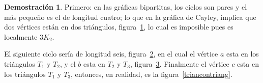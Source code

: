 \documentclass[11pt]{book}
\theoremstyle{definition}
\newtheorem{demostration}{Demostración}
\begin{document}
\begin{demostration}Primero: en las gráficas bipartitas, los ciclos
  son pares y el más pequeño es el de longitud cuatro; lo que en la
  gráfica de Cayley, implica que dos vértices están en dos triángulos,
  figura~\ref{bipcuello4}, lo cual es imposible pues es localmente
  $3K_2$.

\begin{figure}[htb]
  \centering
  \caption{} \label{bipcuello4}
\end{figure}



\begin{figure}\centering
  \caption{}\label{bipciclo6}
\end{figure}




El siguiente ciclo sería de longitud seis, figura~\ref{bipciclo6}, en
el cual el vértice $a$ esta en los triángulos $T_1$ y $T_2$, y el $b$
esta en $T_2$ y $T_3$, figura~\ref{bipartitalong6}. Finalmente el
vértice $c$ esta en los triángulos $T_1$ y $T_3$, entonces, en
realidad, es la figura~\ref{triancontriang}.


\begin{figure}[htb]
  \centering
  \caption{}
  \label{bipartitalong6}
\end{figure}


\end{demostration}
\end{document}
